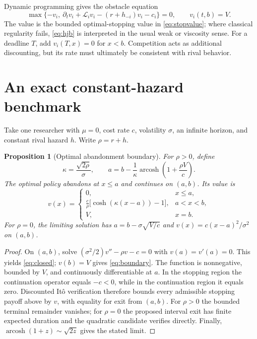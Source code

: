 \documentclass[11pt]{article}
\newtheorem{proposition}{Proposition}
\newcommand{\Lgen}{\mathcal L}
\DeclareMathOperator{\arcosh}{arcosh}
\begin{document}
Dynamic programming gives the obstacle equation
\begin{equation}\label{eq:hjb}
\boxed{\max\{-v_i,\ \partial_t v_i+\Lgen_i v_i
 -(r+h_{-i})v_i-c_i\}=0,\qquad v_i(t,b)=V.}
\end{equation}
The value is the bounded optimal-stopping value in \eqref{eq:stopvalue};
where classical regularity fails, \eqref{eq:hjb} is interpreted in the
usual weak or viscosity sense. For a deadline $T$, add
$v_i(T,x)=0$ for $x<b$. Competition acts as additional discounting, but its
rate must ultimately be consistent with rival behavior.

\section{An exact constant-hazard benchmark}
Take one researcher with $\mu=0$, cost rate $c$, volatility $\sigma$,
an infinite horizon, and constant rival hazard $h$. Write $\rho=r+h$.

\begin{proposition}[Optimal abandonment boundary]\label{prop:boundary}
For $\rho>0$, define
\begin{equation}\label{eq:boundary}
\kappa=\frac{\sqrt{2\rho}}{\sigma},\qquad
a=b-\frac{1}{\kappa}\arcosh\left(1+\frac{\rho V}{c}\right).
\end{equation}
The optimal policy abandons at $x\le a$ and continues on $(a,b)$. Its value is
\begin{equation}\label{eq:closed}
v(x)=\begin{cases}
0,&x\le a,\\[2pt]
\displaystyle\frac{c}{\rho}\bigl[\cosh(\kappa(x-a))-1\bigr],&a<x<b,\\[2pt]
V,&x=b.
\end{cases}
\end{equation}
For $\rho=0$, the limiting solution has
$a=b-\sigma\sqrt{V/c}$ and $v(x)=c(x-a)^2/\sigma^2$ on $(a,b)$.
\end{proposition}
\begin{proof}
On $(a,b)$, solve $(\sigma^2/2)v''-\rho v-c=0$ with
$v(a)=v'(a)=0$. This yields \eqref{eq:closed}; $v(b)=V$ gives
\eqref{eq:boundary}. The function is nonnegative, bounded by $V$, and
continuously differentiable at $a$. In the stopping region the continuation
operator equals $-c<0$, while in the continuation region it equals zero.
Discounted It\^o verification therefore bounds every admissible stopping
payoff above by $v$, with equality for exit from $(a,b)$. For $\rho>0$ the
bounded terminal remainder vanishes; for $\rho=0$ the proposed interval
exit has finite expected duration and the quadratic candidate verifies
directly. Finally, $\arcosh(1+z)\sim\sqrt{2z}$ gives the stated limit.
\end{proof}
\end{document}
